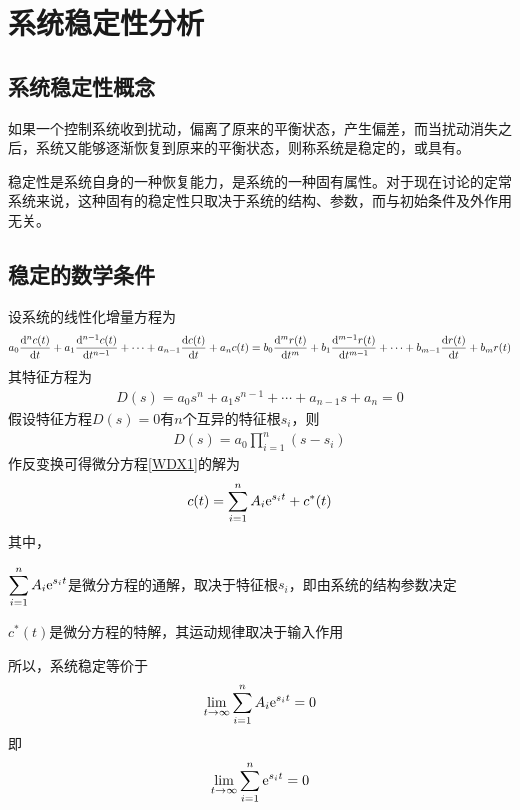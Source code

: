 \section{系统稳定性分析}
\subsection{系统稳定性概念}
\tdefination[系统稳定性]
如果一个控制系统收到扰动，偏离了原来的平衡状态，产生偏差，而当扰动消失之后，系统又能够逐渐恢复到原来的平衡状态，则称系统是稳定的，或具有。

稳定性是系统自身的一种恢复能力，是系统的一种固有属性。对于现在讨论的定常系统来说，这种固有的稳定性只取决于系统的结构、参数，而与初始条件及外作用无关。\vspace*{1em}

\subsection{稳定的数学条件}
设系统的线性化增量方程为
\begin{align}
	a_0 \dfrac{{\rm{d}}^n c(t)}{{\rm{d}} t} + a_1 \dfrac{{\rm{d}}^{n-1} c(t)}{{\rm{d}} t^{n-1}}+\cdots + a_{n-1}\dfrac{{\rm{d}} c(t)}{{\rm{d}} t} + a_nc(t) = b_0\dfrac{{\rm{d}}^m r(t)}{{\rm{d}} t^m} + b_1 \dfrac{{\rm{d}}^{m-1} r(t)}{{\rm{d}} t^{m-1}} + \cdots + b_{m-1}\dfrac{{\rm{d}} r(t)}{{\rm{d}} t} + b_mr(t)
	\label{WDX1}
\end{align}
其特征方程为
\begin{align}
	D(s) = a_0s^n + a_1 s^{n-1} + \cdots + a_{n-1}s +a_n=0
\end{align}
假设特征方程$D(s) = 0$有$n$个互异的特征根$s_i$，则
\begin{align}
	D(s) = a_0 \prod_{i = 1}^{n}(s - s_i)
\end{align}
作反变换可得微分方程\ref{WDX1}的解为
\begin{align}
	c(t) = \sum_{i = 1}^{n}A_i{\rm{e}}^{s_i t}+c^*(t)
\end{align}
其中，
\begin{myitemize}
	\item $\displaystyle  \sum_{i = 1}^{n}A_i{\rm{e}}^{s_i t}$是微分方程的通解，取决于特征根$s_i$，即由系统的结构参数决定
	\item $\displaystyle c^*(t)$是微分方程的特解，其运动规律取决于输入作用
\end{myitemize}
所以，系统稳定等价于
\begin{align}
	\lim\limits_{t \to \infty}  \sum_{i = 1}^{n}A_i{\rm{e}}^{s_i t} = 0
\end{align}
即
\begin{align}
	\lim\limits_{t \to \infty}  \sum_{i = 1}^{n}{\rm{e}}^{s_i t} = 0
\end{align}

